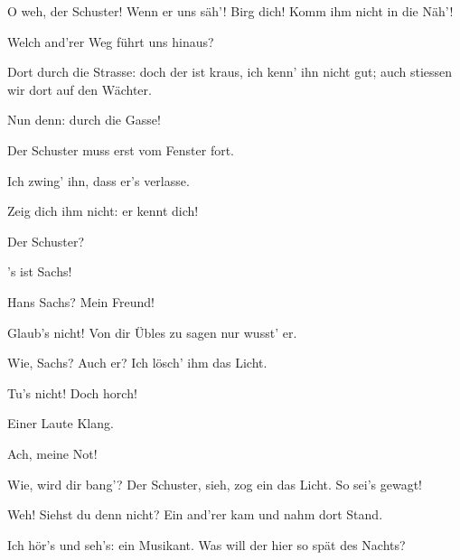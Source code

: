 \begin{drama}
O weh, der Schuster!
Wenn er uns säh'!
Birg dich! Komm ihm nicht in die Näh'!

\Waltherspeaks
Welch and'rer Weg führt uns hinaus?

\Evaspeaks
Dort durch die Strasse:
doch der ist kraus,
ich kenn' ihn nicht gut;
auch stiessen wir dort auf den Wächter.

\Waltherspeaks
Nun denn:
durch die Gasse!

\Evaspeaks
Der Schuster muss erst vom Fenster fort.

\Waltherspeaks
Ich zwing' ihn, dass er's verlasse.

\Evaspeaks
Zeig dich ihm nicht:
er kennt dich!

\Waltherspeaks
Der Schuster?

\Evaspeaks
's ist Sachs!

\Waltherspeaks
Hans Sachs? Mein Freund!

\Evaspeaks
Glaub's nicht! Von dir Übles zu sagen nur wusst' er.

\Waltherspeaks
Wie, Sachs? Auch er? Ich lösch' ihm das Licht.


\scene


\Evaspeaks


Tu's nicht! Doch horch!

\Waltherspeaks
Einer Laute Klang.



\Evaspeaks
Ach, meine Not!

\Waltherspeaks
Wie, wird dir bang'?
Der Schuster, sieh, zog ein das Licht. So sei's gewagt!

\Evaspeaks
Weh! Siehst du denn nicht?
Ein and'rer kam und nahm dort Stand.



\Waltherspeaks
Ich hör's und seh's: ein Musikant.
Was will der hier so spät des Nachts?

\Evaspeaks



\end{drama}
